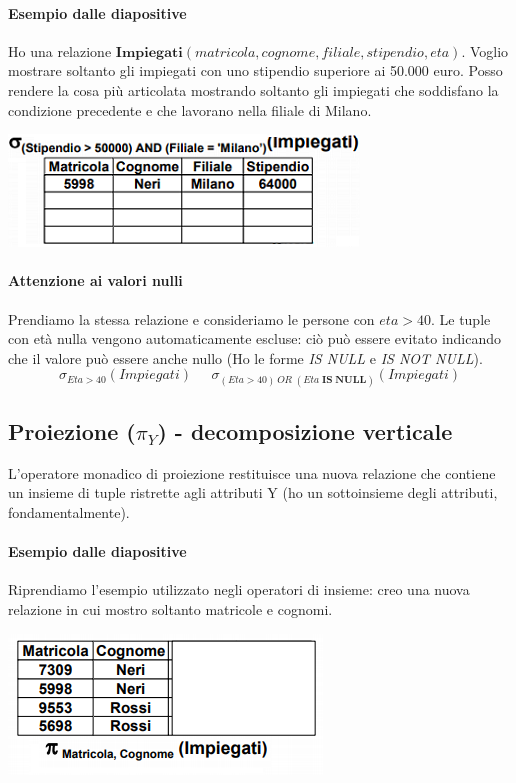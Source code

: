 \paragraph{Esempio dalle diapositive} Ho una relazione $\mathbf{Impiegati}(matricola,cognome,filiale,stipendio,eta)$. Voglio mostrare soltanto gli impiegati con uno stipendio superiore ai 50.000 euro. Posso rendere la cosa più articolata mostrando soltanto gli impiegati che soddisfano la condizione precedente e che lavorano nella filiale di Milano.

\begin{center}
	\includegraphics{images/32.PNG}
\end{center}

\paragraph{Attenzione ai valori nulli} Prendiamo la stessa relazione e consideriamo le persone con $eta > 40$. Le tuple con età nulla vengono automaticamente escluse: ciò può essere evitato indicando che il valore può essere anche nullo (Ho le forme \emph{IS NULL} e \emph{IS NOT NULL}). 
\[\sigma_{Eta > 40}(Impiegati)\;\;\;\;\;\sigma_{(Eta > 40)\, OR \;(Eta\; \mathbf{IS\;NULL})}(Impiegati)\]
\subsection{Proiezione ($\pi_Y$) - decomposizione verticale}
L'operatore monadico di proiezione restituisce una nuova relazione che contiene un insieme di tuple ristrette agli attributi Y (ho un sottoinsieme degli attributi, fondamentalmente).
\paragraph{Esempio dalle diapositive} Riprendiamo l'esempio utilizzato negli operatori di insieme: creo una nuova relazione in cui mostro soltanto matricole e cognomi.

\begin{center}
	\includegraphics{images/33.PNG}
\end{center}

